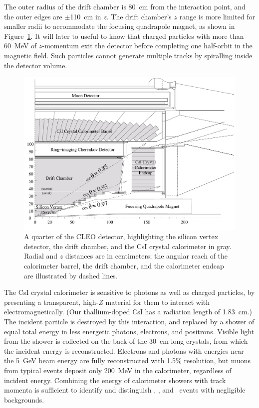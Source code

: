 \documentclass{cornell}
\begin{document}
The outer radius of the drift chamber is 80~cm from the interaction
point, and the outer edges are $\pm$110~cm in $z$.  The drift
chamber's $z$ range is more limited for smaller radii to accommodate
the focusing quadrapole magnet, as shown in Figure~\ref{quarterview}.
It will later to useful to know that charged particles with more than
60~MeV of $z$-momentum exit the detector before completing one
half-orbit in the magnetic field.  Such particles cannot generate
multiple tracks by spiralling inside the detector volume.
\label{pag:spiraling}

\begin{figure}[p]
  \begin{center}
    \includegraphics[height=0.8\linewidth, angle=90]{plots/quarterview}
  \end{center}
  \caption{\label{quarterview} A quarter of the CLEO detector,
  highlighting the silicon vertex detector, the drift chamber, and the
  CsI crystal calorimeter in gray.  Radial and $z$ distances are in
  centimeters; the angular reach of the calorimeter barrel, the drift
  chamber, and the calorimeter endcap are illustrated by dashed lines.}
\end{figure}

The CsI crystal calorimeter is sensitive to photons as well as charged
particles, by presenting a transparent, high-$Z$ material for them to
interact with electromagnetically.  (Our thallium-doped CsI has a
radiation length of 1.83~cm.)  The incident particle is destroyed by
this interaction, and replaced by a shower of equal total energy in
less energetic photons, electrons, and positrons.  Visible light from
the shower is collected on the back of the 30~cm-long crystals,
from which the incident energy is reconstructed.  Electrons and
photons with energies near the 5~GeV beam energy are fully
reconstructed with 1.5\% resolution, but muons from typical events
deposit only 200~MeV in the calorimeter, regardless of incident
energy.  Combining the energy of calorimeter showers with track
momenta is sufficient to identify and distinguish \ee, \mumu, and
\gamgam\ events with negligible backgrounds.
\end{document}
